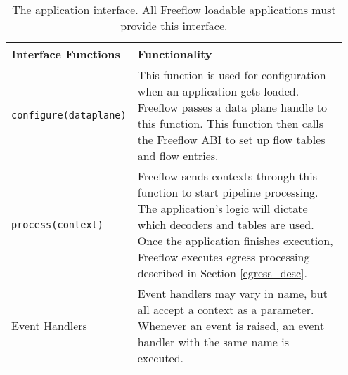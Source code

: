 \begin{table}[ht]
\caption{The application interface. All Freeflow loadable applications must provide this interface.}
\begin{center}
\begin{tabular}{| p{0.3\linewidth} | p{0.65\linewidth} |}
\hline
Interface Functions & Functionality \\

\hline

\texttt{configure(dataplane)} & This function is used for configuration when an application gets loaded. Freeflow passes a data plane handle to this function. This function then calls the Freeflow ABI to set up flow tables and flow entries. \\

\hline

\texttt{process(context)} & Freeflow sends contexts through this function to start pipeline processing. The application's logic will dictate which decoders and tables are used. Once the application finishes execution, Freeflow executes egress processing described in Section \ref{egress_desc}. \\

\hline
Event Handlers & Event handlers may vary in name, but all accept a context as a parameter. Whenever an event is raised, an event handler with the same name is executed.\\
\hline

\end{tabular}
\end{center}
\label{tbl:steve_api}
\end{table}

